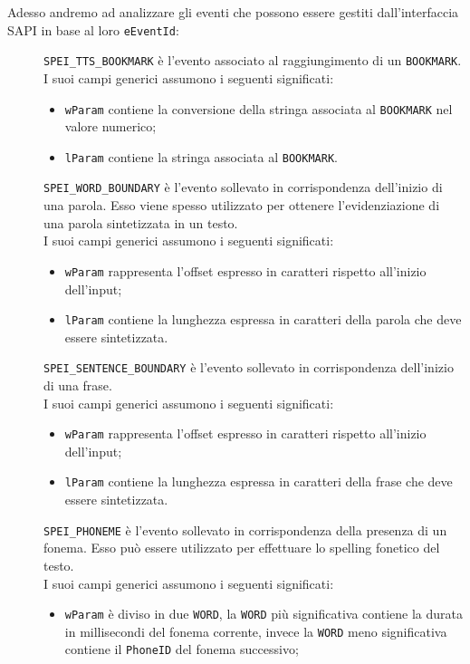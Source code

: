Adesso andremo ad analizzare gli eventi che possono essere gestiti dall'interfaccia SAPI in base al loro \texttt{eEventId}: 
\begin{description}
	\item [] \texttt{SPEI\_TTS\_BOOKMARK} è l'evento associato al raggiungimento di un \texttt{BOOKMARK}.\\
	I suoi campi generici assumono i seguenti significati:
	\begin{itemize}
		\item \texttt{wParam} contiene la conversione della stringa associata al \texttt{BOOKMARK} nel valore numerico;
		\item \texttt{lParam} contiene la stringa associata al \texttt{BOOKMARK}.
	\end{itemize}
	\item [] \texttt{SPEI\_WORD\_BOUNDARY} è l'evento sollevato in corrispondenza dell'inizio di una parola. Esso viene spesso utilizzato per ottenere l'evidenziazione di una parola sintetizzata in un testo.\\
	I suoi campi generici assumono i seguenti significati:
	\begin{itemize}
		\item \texttt{wParam} rappresenta l'offset espresso in caratteri rispetto all'inizio dell'input;
		\item \texttt{lParam} contiene la lunghezza espressa in caratteri della parola che deve essere sintetizzata.
	\end{itemize}
	\item [] \texttt{SPEI\_SENTENCE\_BOUNDARY} è l'evento sollevato in corrispondenza dell'inizio di una frase.\\
	I suoi campi generici assumono i seguenti significati:
	\begin{itemize}
		\item \texttt{wParam} rappresenta l'offset espresso in caratteri rispetto all'inizio dell'input;
		\item \texttt{lParam} contiene la lunghezza espressa in caratteri della frase che deve essere sintetizzata.
	\end{itemize}
	\item [] \texttt{SPEI\_PHONEME} è l'evento sollevato in corrispondenza della presenza di un fonema. Esso può essere utilizzato per effettuare lo spelling fonetico del testo.\\
	I suoi campi generici assumono i seguenti significati:
	\begin{itemize}
		\item \texttt{wParam} è diviso in due \texttt{WORD}, la \texttt{WORD} più significativa contiene la durata in millisecondi del fonema corrente, invece la \texttt{WORD} meno significativa contiene il \texttt{PhoneID} del fonema successivo;

\end{itemize}
\end{description}
